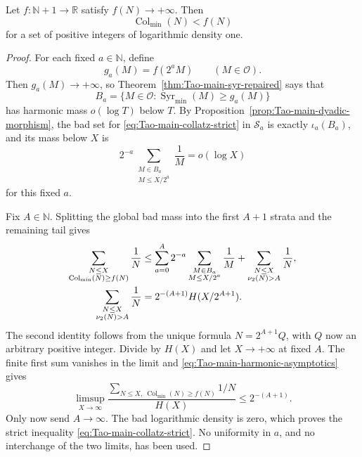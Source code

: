\begin{theorem}
\label{thm:Tao-main-repaired}
Let \(f:\mathbb N+1\to\mathbb R\) satisfy \(f(N)\to+\infty\).  Then
\begin{equation}
\label{eq:Tao-main-collatz-strict}
 \operatorname{Col}_{\min}(N)<f(N)
\end{equation}
for a set of positive integers of logarithmic density one.
\end{theorem}

\begin{proof}
For each fixed \(a\in\mathbb N\), define
\[
 g_a(M)=f(2^aM)\qquad(M\in\mathcal O).
\]
Then \(g_a(M)\to+\infty\), so
Theorem~\ref{thm:Tao-main-syr-repaired} says that
\[
 B_a=\{M\in\mathcal O:
       \operatorname{Syr}_{\min}(M)\geq g_a(M)\}
\]
has harmonic mass \(o(\log T)\) below \(T\).  By
Proposition~\ref{prop:Tao-main-dyadic-morphism}, the bad set for
\eqref{eq:Tao-main-collatz-strict} in \(\mathcal S_a\) is exactly
\(\iota_a(B_a)\), and its mass below \(X\) is
\[
 2^{-a}\sum_{\substack{M\in B_a\\M\leq X/2^a}}\frac1M=o(\log X)
\]
for this fixed \(a\).

Fix \(A\in\mathbb N\).  Splitting the global bad mass into the first
\(A+1\) strata and the remaining tail gives
\begin{align}
 \sum_{\substack{N\leq X\\
   \operatorname{Col}_{\min}(N)\geq f(N)}}\frac1N
 &\leq\sum_{a=0}^A2^{-a}
   \sum_{\substack{M\in B_a\\M\leq X/2^a}}\frac1M
 +\sum_{\substack{N\leq X\\\nu_2(N)>A}}\frac1N,\notag\\
 \sum_{\substack{N\leq X\\\nu_2(N)>A}}\frac1N
 &=2^{-(A+1)}H(X/2^{A+1}).
\label{eq:Tao-main-dyadic-tail-limit}
\end{align}
The second identity follows from the unique formula
\(N=2^{A+1}Q\), with \(Q\) now an arbitrary positive integer.  Divide by
\(H(X)\) and let \(X\to+\infty\) at fixed \(A\).  The finite first sum
vanishes in the limit and
\eqref{eq:Tao-main-harmonic-asymptotics} gives
\[
 \limsup_{X\to\infty}
 \frac{\sum_{N\leq X,\ \operatorname{Col}_{\min}(N)\geq f(N)}1/N}
      {H(X)}
 \leq2^{-(A+1)}.
\]
Only now send \(A\to\infty\).  The bad logarithmic density is zero, which
proves the strict inequality \eqref{eq:Tao-main-collatz-strict}.  No
uniformity in \(a\), and no interchange of the two limits, has been used.
\end{proof}

